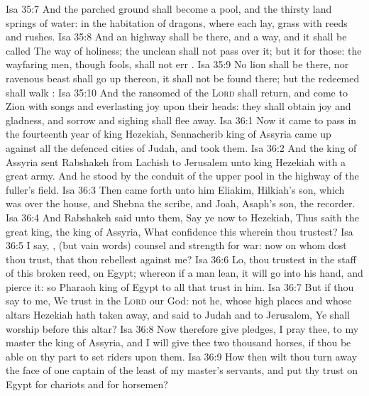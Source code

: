\vs Isa 35:7 And the parched ground shall become a pool, and the thirsty land springs of water: in the habitation of dragons, where each lay,  grass with reeds and rushes.
\vs Isa 35:8 And an highway shall be there, and a way, and it shall be called The way of holiness; the unclean shall not pass over it; but it  for those: the wayfaring men, though fools, shall not err .
\vs Isa 35:9 No lion shall be there, nor  ravenous beast shall go up thereon, it shall not be found there; but the redeemed shall walk :
\vs Isa 35:10 And the ransomed of the \textsc{Lord} shall return, and come to Zion with songs and everlasting joy upon their heads: they shall obtain joy and gladness, and sorrow and sighing shall flee away.
\vs Isa 36:1 Now it came to pass in the fourteenth year of king Hezekiah,  Sennacherib king of Assyria came up against all the defenced cities of Judah, and took them.
\vs Isa 36:2 And the king of Assyria sent Rabshakeh from Lachish to Jerusalem unto king Hezekiah with a great army. And he stood by the conduit of the upper pool in the highway of the fuller's field.
\vs Isa 36:3 Then came forth unto him Eliakim, Hilkiah's son, which was over the house, and Shebna the scribe, and Joah, Asaph's son, the recorder.
\vs Isa 36:4 And Rabshakeh said unto them, Say ye now to Hezekiah, Thus saith the great king, the king of Assyria, What confidence  this wherein thou trustest?
\vs Isa 36:5 I say, , (but  vain words)  counsel and strength for war: now on whom dost thou trust, that thou rebellest against me?
\vs Isa 36:6 Lo, thou trustest in the staff of this broken reed, on Egypt; whereon if a man lean, it will go into his hand, and pierce it: so  Pharaoh king of Egypt to all that trust in him.
\vs Isa 36:7 But if thou say to me, We trust in the \textsc{Lord} our God:  not he, whose high places and whose altars Hezekiah hath taken away, and said to Judah and to Jerusalem, Ye shall worship before this altar?
\vs Isa 36:8 Now therefore give pledges, I pray thee, to my master the king of Assyria, and I will give thee two thousand horses, if thou be able on thy part to set riders upon them.
\vs Isa 36:9 How then wilt thou turn away the face of one captain of the least of my master's servants, and put thy trust on Egypt for chariots and for horsemen?
